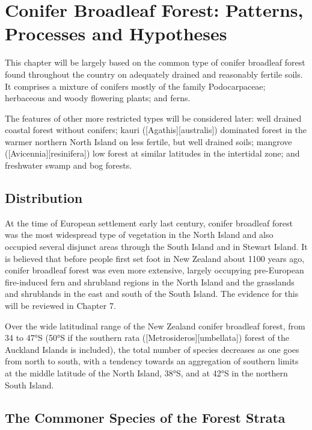 \chapter{Conifer Broadleaf Forest: Patterns, Processes and Hypotheses}

This chapter will be largely based on the common type of conifer broadleaf forest found throughout the country on adequately drained and reasonably fertile soils.
It comprises a mixture of conifers mostly of the family Podocarpaceae; herbaceous and woody flowering plants; and ferns.

The features of other more restricted types will be considered later: well drained coastal forest without conifers; kauri ([Agathis][australis]) dominated forest in the warmer northern North Island on less fertile, but well drained soils; mangrove ([Avicennia][resinifera]) low forest at similar latitudes in the intertidal zone; and freshwater swamp and bog forests.

\section{Distribution}

At the time of European settlement early last century, conifer broadleaf forest was the most widespread type of vegetation in the North Island and also occupied several disjunct areas through the South Island and in Stewart Island.
It is believed that before people first set foot in New Zealand about 1100 years ago, conifer broadleaf forest was even more extensive, largely occupying pre-European fire-induced fern and shrubland regions in the North Island and the grasslands and shrublands in the east and south of the South Island.
The evidence for this will be reviewed in Chapter 7.

Over the wide latitudinal range of the New Zealand conifer broadleaf forest, from 34 to 47°S (50°S if the southern rata ([Metrosideros][umbellata]) forest of the Auckland Islands is included), the total number of species decreases as one goes from north to south, with a tendency towards an aggregation of southern limits at the middle latitude of the North Island, 38°S, and at 42°S in the northern South Island.

\section{The Commoner Species of the Forest Strata}

